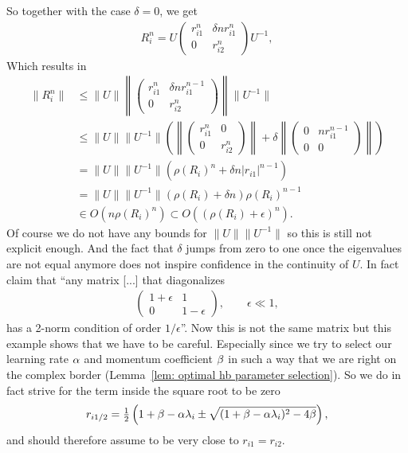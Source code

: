 So together with the case \(\delta=0\), we get
\begin{align*}
	R_i^n = U\begin{pmatrix}
		r_{i1}^n & \delta n r_{i1}^n\\
		0 & r_{i2}^n
	\end{pmatrix}U^{-1},
\end{align*}
Which results in
\begin{align*}
	\|R_i^n\|
	&\le \|U\|
	\left\| \begin{pmatrix}
		r_{i1}^n & \delta n r_{i1}^{n-1}\\
		0 & r_{i2}^n
	\end{pmatrix} \right\|
	\|U^{-1}\|\\
	&\le \|U\|\|U^{-1}\|
	\left(
	\left\| \begin{pmatrix}
		r_{i1}^n & 0\\
		0 & r_{i2}^n
	\end{pmatrix} \right\|
	+ \delta
	\left\| \begin{pmatrix}
		0 &  n r_{i1}^{n-1}\\
		0 & 0
	\end{pmatrix} \right\|
	\right)\\
	&= \|U\|\|U^{-1}\| (\rho(R_i)^n+ \delta n |r_{i1}|^{n-1})\\
	&= \|U\|\|U^{-1}\| (\rho(R_i)+ \delta n)\rho(R_i)^{n-1}\\
	&\in O(n\rho(R_i)^{n}) \subset O((\rho(R_i)+\epsilon)^n).
\end{align*}
%
Of course we do not have any bounds for \(\|U\|\|U^{-1}\|\) so this is still
not explicit enough. And the fact that \(\delta\) jumps from zero to one once the
eigenvalues are not equal anymore does not inspire confidence in the continuity
of \(U\). In fact \textcite[Section 7.1.5]{golubMatrixComputations2013} claim
that ``any matrix [...] that diagonalizes
\begin{align*}
	\begin{pmatrix}
		1+\epsilon & 1 \\
		0 & 1-\epsilon
	\end{pmatrix},
	\qquad \epsilon \ll 1,
\end{align*}
has a 2-norm condition of order \(1/\epsilon\)''. Now this is not the same matrix
but this example shows that we have to be careful. Especially since we try to select
our learning rate \(\alpha\) and momentum coefficient \(\beta\) in such a way
that we are right on the complex border (Lemma~\ref{lem: optimal hb parameter
selection}). So we do in fact strive for the term inside the square root to be zero
\begin{align*}
	r_{i1/2}
	= \tfrac12 \left(
		1+\beta-\alpha\lambda_i
		\pm \sqrt{(1+\beta-\alpha\lambda_i)^2 - 4\beta}
	\right),
\end{align*}
and should therefore assume to be very close to \(r_{i1}=r_{i2}\).

